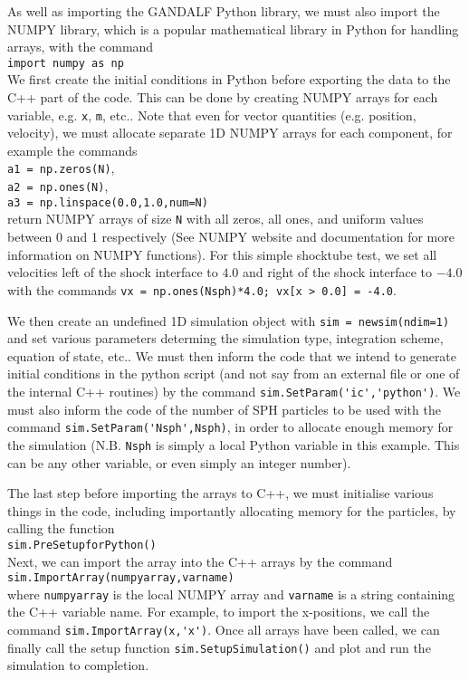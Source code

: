 \documentclass[a4paper]{article}
\newcommand{\var}[1]{\texttt{#1}}
\newcommand{\singlecommand}[1]{\\ \newline \indent \var{#1} \\ \newline \noindent}
\begin{document}




\noindent As well as importing the GANDALF Python library, we must also import the NUMPY library, which is a popular mathematical library in Python for handling arrays, with the command \singlecommand{import numpy as np}
We first create the initial conditions in Python before exporting the data to the C++ part of the code.  This can be done by creating NUMPY arrays for each variable, e.g. \var{x}, \var{m}, etc..  Note that even for vector quantities (e.g. position, velocity), we must allocate separate 1D NUMPY arrays for each component, for example the commands \\
\newline
\indent \lstinline{a1 = np.zeros(N)}, \\
\indent \lstinline{a2 = np.ones(N)}, \\
\indent \lstinline{a3 = np.linspace(0.0,1.0,num=N)} \\
\newline
return NUMPY arrays of size \var{N} with all zeros, all ones, and uniform values between 0 and 1 respectively  (See NUMPY website and documentation for more information on NUMPY functions).  For this simple shocktube test, we set all velocities left of the shock interface to $4.0$ and right of the shock interface to $-4.0$ with the commands \lstinline{vx = np.ones(Nsph)*4.0; vx[x > 0.0] = -4.0}.

We then create an undefined 1D simulation object with \lstinline{sim = newsim(ndim=1)} and set various parameters determing the simulation type, integration scheme, equation of state, etc..  We must then inform the code that we intend to generate initial conditions in the python script (and not say from an external file or one of the internal C++ routines) by the command \lstinline{sim.SetParam('ic','python')}.  We must also inform the code of the number of SPH particles to be used with the command \lstinline{sim.SetParam('Nsph',Nsph)}, in order to allocate enough memory for the simulation (N.B. \var{Nsph} is simply a local Python variable in this example.  This can be any other variable, or even simply an integer number).

The last step before importing the arrays to C++, we must initialise various things in the code, including importantly allocating memory for the particles, by calling the function \singlecommand{sim.PreSetupforPython()}
Next, we can import the array into the C++ arrays by the command \singlecommand{sim.ImportArray(numpyarray,varname)}
where \var{numpyarray} is the local NUMPY array and \var{varname} is a string containing the C++ variable name.  For example, to import the x-positions, we call the command \lstinline{sim.ImportArray(x,'x')}.  Once all arrays have been called, we can finally call the setup function \lstinline{sim.SetupSimulation()} and plot and run the simulation to completion.
\end{document}
